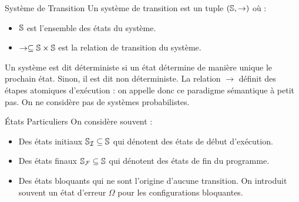 \documentclass{cours}
\begin{document}
\begin{définition}{Système de Transition}{}
    Un système de transition est un tuple $\left(\S, \rightarrow\right)$ où : 
    \begin{itemize}
        \item $\S$ est l'ensemble des états du système. 
        \item $\rightarrow \subseteq \S \times \S$ est la relation de transition du système. 
    \end{itemize}
\end{définition}

Un système est dit déterministe si un état détermine de manière unique le prochain état. Sinon, il est dit non déterministe. La relation $\rightarrow$ définit des étapes atomiques d'exécution : on appelle donc ce paradigme sémantique à petit pas. On ne considère pas de systèmes probabilistes.
\begin{définition}{États Particuliers}{}
    On considère souvent : 
    \begin{itemize}
        \item Des états initiaux $\S_{\mI} \subseteq \S$ qui dénotent des états de début d'exécution. 
        \item Des états finaux $\S_{\mF} \subseteq \S$ qui dénotent des états de fin du programme. 
        \item Des états bloquants qui ne sont l'origine d'aucune transition. On introduit souvent un état d'erreur $\Omega$ pour les configurations bloquantes. 
    \end{itemize}
\end{définition}
\end{document}
